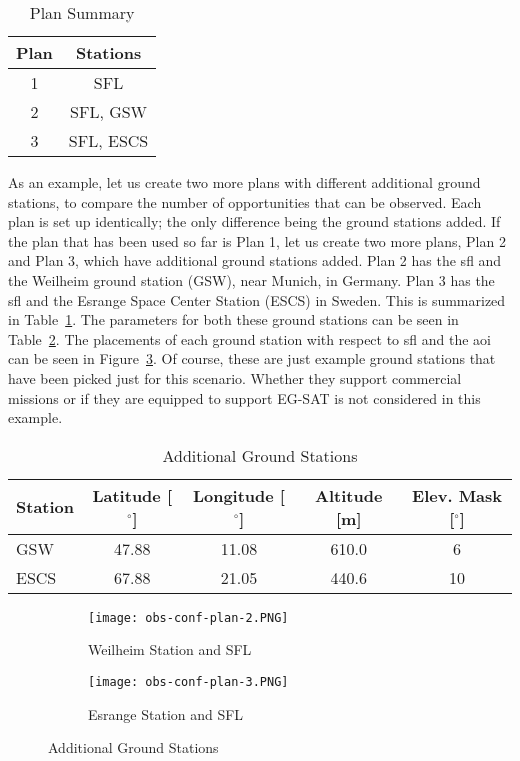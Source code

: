 \begin{table}[h] 
    \centering
    \caption{Plan Summary}
    \begin{tabular}{cc}
	Plan & Stations \\ \hline
	1   &	SFL \\
	2   &	SFL, GSW \\
	3   &	SFL, ESCS 
    \end{tabular}
    \label{tab:additional-plans}
\end{table}

As an example, let us create two more plans with different additional ground
stations, to compare the number of opportunities that can be observed. Each plan is
set up identically; the only difference being the ground stations added. If the
plan that has been used so far is Plan 1, let us create two more plans,
Plan 2 and Plan 3, which have additional ground stations added.  Plan 2 has the
\gls{sfl} and the Weilheim ground station (GSW), near Munich, in Germany. Plan
3 has the \gls{sfl} and the Esrange Space Center Station (ESCS) in Sweden. This
is summarized in Table~\ref{tab:additional-plans}. The parameters for both
these ground stations can be seen in Table~\ref{tab:additional-gs}. The
placements of each ground station with respect to \gls{sfl} and the \gls{aoi}
can be seen in Figure~\ref{fig:obs-conf-gs-placements}. Of course, these are
just example ground stations that have been picked just for this scenario.
Whether they support commercial missions or if they are equipped to support
EG-SAT is not considered in this example.  

\begin{table}[h] 
    \centering
    \caption{Additional Ground Stations}
    \begin{tabular}{ccccc}
	Station & Latitude [$^\circ$] & Longitude [$^\circ$] & Altitude [m] & Elev. Mask [$^\circ$] \\ \hline
	\multicolumn{1}{l|}{GSW}  & 47.88   & 11.08   & 610.0  & 6      \\
	\multicolumn{1}{l|}{ESCS} & 67.88   & 21.05   & 440.6  & 10      \\
    \end{tabular}
    \label{tab:additional-gs}
\end{table}

\begin{figure}
    \centering
    \begin{subfigure}[b]{0.95\textwidth}
	\centering
	\texttt{[image: obs-conf-plan-2.PNG]} 
	\caption{Weilheim Station and SFL}
	\label{fig:obs-conf-gs-placements-1} 
    \end{subfigure}
    \hfill
    \begin{subfigure}[b]{0.95\textwidth}
	\centering
	\texttt{[image: obs-conf-plan-3.PNG]} 
	\caption{Esrange Station and SFL}
	\label{fig:obs-conf-gs-placements-2}
    \end{subfigure}
    \caption{Additional Ground Stations}
    \label{fig:obs-conf-gs-placements} 
\end{figure}

